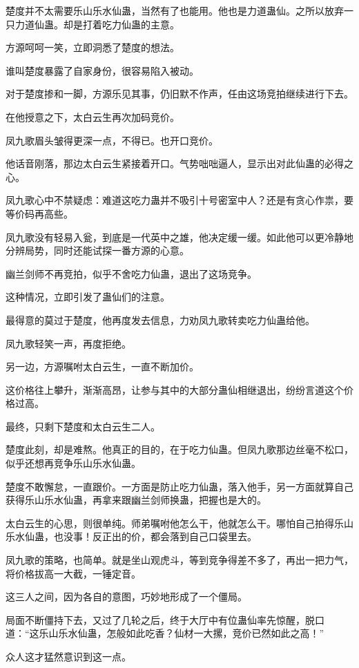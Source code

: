 \begin{this_body}
楚度并不太需要乐山乐水仙蛊，当然有了也能用。他也是力道蛊仙。之所以放弃一只力道仙蛊。却是打着吃力仙蛊的主意。

方源呵呵一笑，立即洞悉了楚度的想法。

谁叫楚度暴露了自家身份，很容易陷入被动。

对于楚度掺和一脚，方源乐见其事，仍旧默不作声，任由这场竞拍继续进行下去。

在他授意之下，太白云生再次加码竞价。

凤九歌眉头皱得更深一点，不得已。也开口竞价。

他话音刚落，那边太白云生紧接着开口。气势咄咄逼人，显示出对此仙蛊的必得之心。

凤九歌心中不禁疑虑：难道这吃力蛊并不吸引十号密室中人？还是有贪心作祟，要等价码再高些。

凤九歌没有轻易入瓮，到底是一代英中之雄，他决定缓一缓。如此他可以更冷静地分辨局势，同时还能试探一番方源的心意。

幽兰剑师不再竞拍，似乎不舍吃力仙蛊，退出了这场竞争。

这种情况，立即引发了蛊仙们的注意。

最得意的莫过于楚度，他再度发去信息，力劝凤九歌转卖吃力仙蛊给他。

凤九歌轻笑一声，再度拒绝。

另一边，方源嘱咐太白云生，一直不断加价。

这价格往上攀升，渐渐高昂，让参与其中的大部分蛊仙相继退出，纷纷言道这个价格过高。

最终，只剩下楚度和太白云生二人。

楚度此刻，却是难熬。他真正的目的，在于吃力仙蛊。但凤九歌那边丝毫不松口，似乎还想再竞争乐山乐水仙蛊。

楚度不敢懈怠，一直跟价。一方面是防止吃力仙蛊，落入他手，另一方面就算自己获得乐山乐水仙蛊，再拿来跟幽兰剑师换蛊，把握也是大的。

太白云生的心思，则很单纯。师弟嘱咐他怎么干，他就怎么干。哪怕自己拍得乐山乐水仙蛊，也没事！反正出的价，都会落到自己口袋里去。

凤九歌的策略，也简单。就是坐山观虎斗，等到竞争得差不多了，再出一把力气，将价格拔高一大截，一锤定音。

这三人之间，因为各自的意图，巧妙地形成了一个僵局。

局面不断僵持下去，又过了几轮之后，终于大厅中有位蛊仙率先惊醒，脱口道：“这乐山乐水仙蛊，怎般如此吃香？仙材一大摞，竞价已然如此之高！”

众人这才猛然意识到这一点。


\end{this_body}
